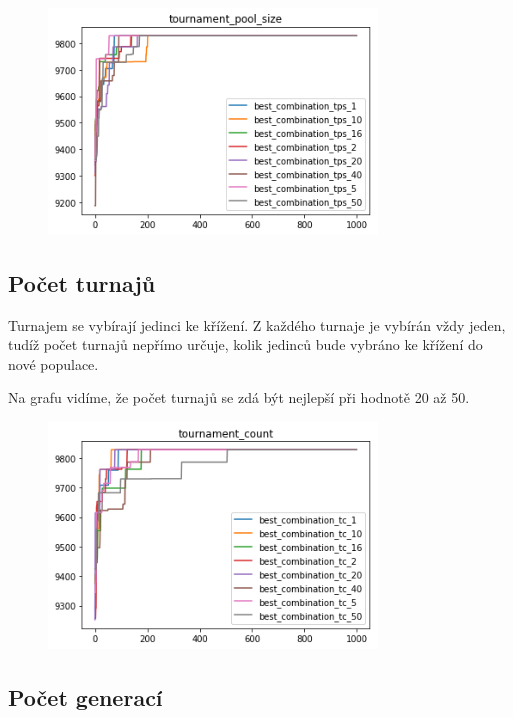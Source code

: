 \documentclass[a4paper,10pt,twocolumn]{article}
\begin{document}
\begin{itemize}
\begin{itemize}
\begin{figure}[H]
  \begin{center}
    \includegraphics[height=6cm]{graphs/tournament_pool_size.png}
  \end{center}
\end{figure}



\subsection{Počet turnajů}

Turnajem se vybírají jedinci ke křížení. Z každého turnaje je vybírán vždy jeden, tudíž počet turnajů nepřímo určuje, kolik jedinců bude vybráno ke křížení do nové populace.


Na grafu vidíme, že počet turnajů se zdá být nejlepší při hodnotě 20 až 50.



\begin{figure}[H]
  \begin{center}
    \includegraphics[height=6cm]{graphs/tournament_count.png}
  \end{center}
\end{figure}


\subsection{Počet generací}


\end{itemize}
\end{itemize}
\end{document}
